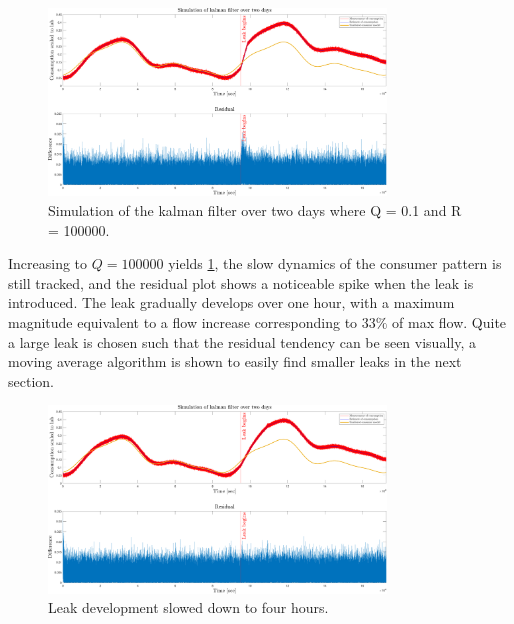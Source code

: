 \begin{figure}[h!]
	\centering
	\includegraphics[width=0.8\textwidth]{Pictures/Kalman_and_Residual_Q01_R100000.pdf}
	
	\caption{Simulation of the kalman filter over two days where Q = 0.1 and R = 100000.}
	\label{fig:Kalman_residual_Q01R100000}
\end{figure}

Increasing to $Q = 100000$ yields \ref{fig:Kalman_residual_Q01R100000}, the slow dynamics of the consumer pattern is still tracked, and the residual plot shows a noticeable spike when the leak is introduced. The leak gradually develops over one hour, with a maximum magnitude equivalent to a flow increase corresponding to $33\%$ of max flow. Quite a large leak is chosen such that the residual tendency can be seen visually, a moving average algorithm is shown to easily find smaller leaks in the next section. 

\begin{figure}[h!]
	\centering
	\includegraphics[width=0.8\textwidth]{Pictures/Kalman_and_Residual_Q01_R100000_4hr.pdf}
	
	\caption{Leak development slowed down to four hours.}
	\label{fig:Kalman_and_Residual_Q01_R100000_4hr}
\end{figure}


